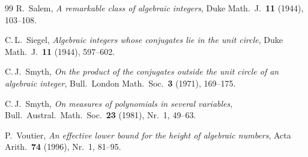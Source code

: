 \documentclass[12pt,a4paper]{amsart}
\theoremstyle{definition}
\theoremstyle{remark}
\begin{document}
\begin{thebibliography}{99}
R.\ Salem,
\textit{A remarkable class of algebraic integers},
Duke Math.\ J.\ \textbf{11} (1944), 103--108.

C.\,L.\ Siegel,
\textit{Algebraic integers whose conjugates lie in the unit circle},
Duke Math.\ J.\ \textbf{11} (1944), 597--602.

C.\,J.\ Smyth,
\textit{On the product of the conjugates outside the unit circle of an algebraic integer},
Bull.\ London Math.\ Soc.\ \textbf{3} (1971), 169--175.

C.\,J.\ Smyth,
\textit{On measures of polynomials in several variables},
Bull.\ Austral.\ Math.\ Soc.\ \textbf{23} (1981), Nr.\ 1, 49--63.

P.\ Voutier,
\textit{An effective lower bound for the height of algebraic numbers},
Acta Arith.\ \textbf{74} (1996), Nr.\ 1, 81--95.

\end{thebibliography}
\end{document}
